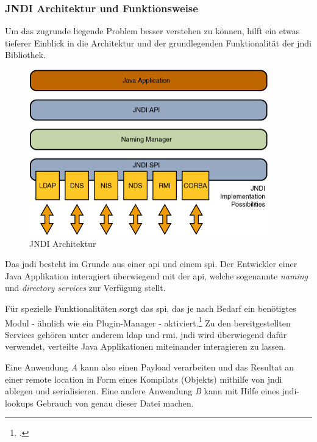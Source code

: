 \subsubsection{JNDI Architektur und Funktionsweise}

Um das zugrunde liegende Problem besser verstehen zu können, hilft ein etwas tieferer Einblick in die Architektur
und der grundlegenden Funktionalität der \gls{jndi} Bibliothek.
\begin{figure}[!htb]\label{fig:jndiarch} %
    \begin{center}
        \includegraphics[scale=0.75]{images/jndiarch}
    \end{center}
    \caption{JNDI Architektur}
\end{figure}
\bigskip

Das \gls{jndi} besteht im Grunde aus einer \gls{api} und einem \gls{spi}.
Der Entwickler einer Java Applikation interagiert überwiegend mit der \gls{api}, welche sogenannte \textit{naming} und \textit{directory services} zur Verfügung stellt.

Für spezielle Funktionalitäten sorgt das \gls{spi}, das je nach Bedarf ein benötigtes Modul - ähnlich wie ein Plugin-Manager - aktiviert.\footcite{JNDIArchitektur}
Zu den bereitgestellten Services gehören unter anderem \gls{ldap} und \gls{rmi}.
\gls{jndi} wird überwiegend dafür verwendet, verteilte Java Applikationen miteinander interagieren zu lassen.

Eine Anwendung \textit{A} kann also einen Payload verarbeiten und das Resultat an einer remote location in Form eines Kompilats (Objekts) mithilfe von \gls{jndi} ablegen und serialisieren.
Eine andere Anwendung \textit{B} kann mit Hilfe eines \gls{jndi}-lookups Gebrauch von genau dieser Datei machen.

